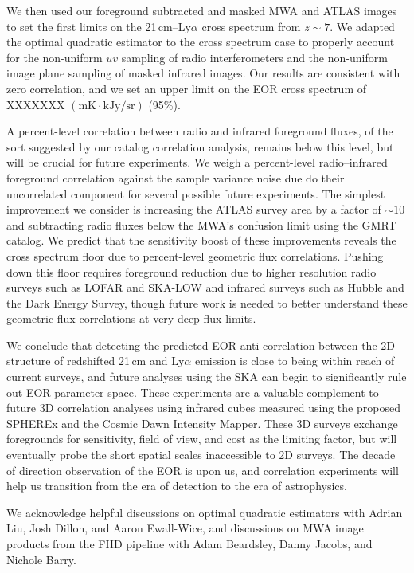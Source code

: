 \documentclass[numberedappendix]{emulateapj}
\begin{document}
We then used our foreground subtracted and masked MWA and ATLAS images to set the first limits on the 21\,cm--Ly$\alpha$ cross spectrum from $z\sim7$. We adapted the optimal quadratic estimator to the cross spectrum case to properly account for the non-uniform $uv$ sampling of radio interferometers and the non-uniform image plane sampling of masked infrared images. Our results are consistent with zero correlation, and we set an upper limit on the EOR cross spectrum of XXXXXXX $(\text{mK}\cdot \text{kJy/sr})$ (95\%). 

A percent-level correlation between radio and infrared foreground fluxes, of the sort suggested by our catalog correlation analysis, remains below this level, but will be crucial for future experiments. We weigh a percent-level radio--infrared foreground correlation against the sample variance noise due do their uncorrelated component for several possible future experiments. The simplest improvement we consider is increasing the ATLAS survey area by a factor of $\sim10$ and subtracting radio fluxes below the MWA's confusion limit using the GMRT catalog. We predict that the sensitivity boost of these improvements reveals the cross spectrum floor due to percent-level geometric flux correlations. Pushing down this floor requires foreground reduction due to higher resolution radio surveys such as LOFAR and SKA-LOW and infrared surveys such as Hubble and the Dark Energy Survey, though future work is needed to better understand these geometric flux correlations at very deep flux limits.

We conclude that detecting the predicted EOR anti-correlation between the 2D structure of redshifted 21\,cm and Ly$\alpha$ emission is close to being within reach of current surveys, and future analyses using the SKA can begin to significantly rule out EOR parameter space. These experiments are a valuable complement to future 3D correlation analyses using infrared cubes measured using the proposed SPHEREx and the Cosmic Dawn Intensity Mapper. These 3D surveys exchange foregrounds for sensitivity,  field of view, and cost as the limiting factor, but will eventually probe the short spatial scales inaccessible to 2D surveys. The decade of direction observation of the EOR is upon us, and correlation experiments will help us transition from the era of detection to the era of astrophysics.

\begin{acknowledgments}
We acknowledge helpful discussions on optimal quadratic estimators with Adrian Liu, Josh Dillon, and Aaron Ewall-Wice, and discussions on MWA image products from the FHD pipeline with Adam Beardsley, Danny Jacobs, and Nichole Barry. 
\end{acknowledgments}
\end{document}
